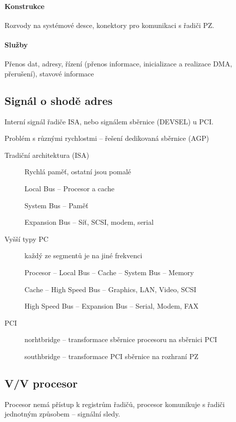 \documentclass[a4paper, 11pt]{report}
\begin{document}
\paragraph{Konstrukce} Rozvody na systémové desce, konektory pro komunikaci s řadiči PZ.

\paragraph{Služby} Přenos dat, adresy, řízení (přenos informace, inicializace a realizace DMA, přerušení), stavové informace

\subsection{Signál o shodě adres}
Interní signál řadiče ISA, nebo signálem sběrnice (DEVSEL) u PCI.

Problém s různými rychlostmi -- řešení dedikovaná sběrnice (AGP)

\begin{description}
	\item[Tradiční architektura (ISA)] Rychlá paměť, ostatní jsou pomalé
	
	Local Bus -- Procesor a cache
	
	System Bus -- Paměť
	
	Expansion Bus -- Síť, SCSI, modem, serial
	
	\item[Vyšší typy PC] každý ze segmentů je na jiné frekvenci
	
	Procesor -- Local Bus -- Cache -- System Bus -- Memory
	
	Cache -- High Speed Bus -- Graphics, LAN, Video, SCSI
	
	High Speed Bus -- Expansion Bus -- Serial, Modem, FAX
	
	\item[PCI]
	
	norhtbridge -- transformace sběrnice procesoru na sběrnici PCI
	
	southbridge -- transformace PCI sběrnice na rozhraní PZ
\end{description}

\subsection{V/V procesor}

Procesor nemá přístup k registrům řadičů, procesor komunikuje s řadiči jednotným způsobem -- signální sledy.
\end{document}
